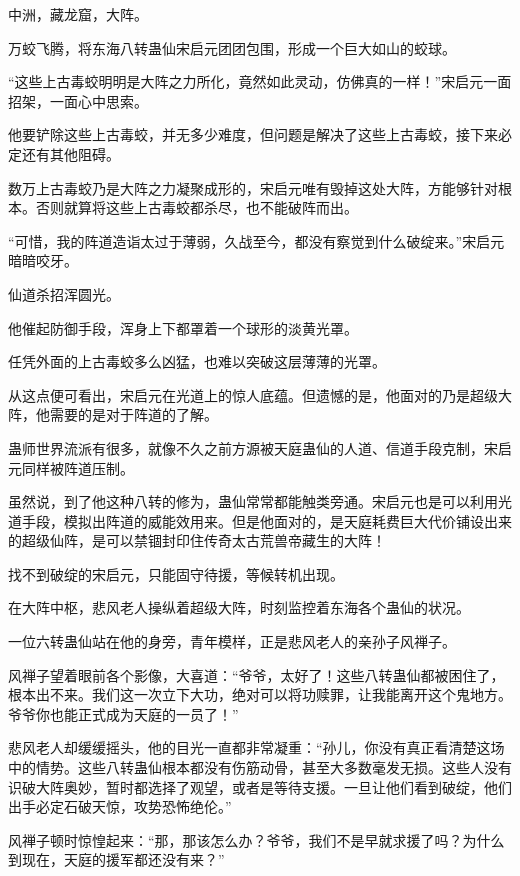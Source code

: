 
\begin{this_body}



中洲，藏龙窟，大阵。

万蛟飞腾，将东海八转蛊仙宋启元团团包围，形成一个巨大如山的蛟球。

“这些上古毒蛟明明是大阵之力所化，竟然如此灵动，仿佛真的一样！”宋启元一面招架，一面心中思索。

他要铲除这些上古毒蛟，并无多少难度，但问题是解决了这些上古毒蛟，接下来必定还有其他阻碍。

数万上古毒蛟乃是大阵之力凝聚成形的，宋启元唯有毁掉这处大阵，方能够针对根本。否则就算将这些上古毒蛟都杀尽，也不能破阵而出。

“可惜，我的阵道造诣太过于薄弱，久战至今，都没有察觉到什么破绽来。”宋启元暗暗咬牙。

仙道杀招浑圆光。

他催起防御手段，浑身上下都罩着一个球形的淡黄光罩。

任凭外面的上古毒蛟多么凶猛，也难以突破这层薄薄的光罩。

从这点便可看出，宋启元在光道上的惊人底蕴。但遗憾的是，他面对的乃是超级大阵，他需要的是对于阵道的了解。

蛊师世界流派有很多，就像不久之前方源被天庭蛊仙的人道、信道手段克制，宋启元同样被阵道压制。

虽然说，到了他这种八转的修为，蛊仙常常都能触类旁通。宋启元也是可以利用光道手段，模拟出阵道的威能效用来。但是他面对的，是天庭耗费巨大代价铺设出来的超级仙阵，是可以禁锢封印住传奇太古荒兽帝藏生的大阵！

找不到破绽的宋启元，只能固守待援，等候转机出现。

在大阵中枢，悲风老人操纵着超级大阵，时刻监控着东海各个蛊仙的状况。

一位六转蛊仙站在他的身旁，青年模样，正是悲风老人的亲孙子风禅子。

风禅子望着眼前各个影像，大喜道：“爷爷，太好了！这些八转蛊仙都被困住了，根本出不来。我们这一次立下大功，绝对可以将功赎罪，让我能离开这个鬼地方。爷爷你也能正式成为天庭的一员了！”

悲风老人却缓缓摇头，他的目光一直都非常凝重：“孙儿，你没有真正看清楚这场中的情势。这些八转蛊仙根本都没有伤筋动骨，甚至大多数毫发无损。这些人没有识破大阵奥妙，暂时都选择了观望，或者是等待支援。一旦让他们看到破绽，他们出手必定石破天惊，攻势恐怖绝伦。”

风禅子顿时惊惶起来：“那，那该怎么办？爷爷，我们不是早就求援了吗？为什么到现在，天庭的援军都还没有来？”


\end{this_body}
